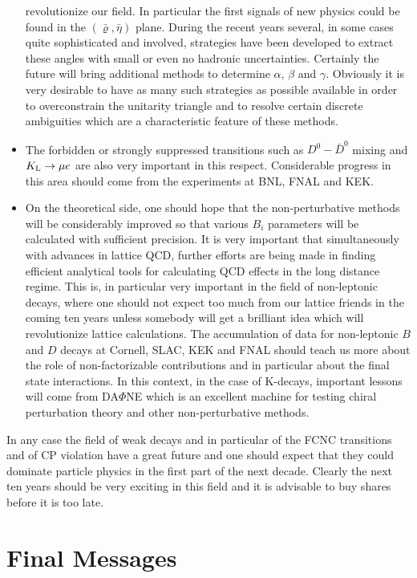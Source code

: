 \begin{itemize}
revolutionize our field. In particular the first signals
of new physics could be found in the $(\bar\varrho,\bar\eta)$ plane.
During the recent years several, in some cases quite sophisticated and
involved, strategies have been developed to extract these angles with
small or even no hadronic uncertainties. Certainly the future will bring
additional methods to determine $\alpha$, $\beta$ and $\gamma$. 
Obviously it is very desirable to have as many such strategies as possible
available in order to overconstrain the unitarity triangle and to resolve 
certain discrete ambiguities which are a characteristic feature of these 
methods.
\item
The forbidden or strongly suppressed transitions such as
$D^0-\bar D^0$ mixing and $K_{\rm L}\to \mu e$ are also very
important in this respect. Considerable progress in this area
should come from the experiments at BNL, FNAL and KEK.
\item
On the theoretical side,
one should hope that the non-perturbative
methods will be considerably improved so that various $B_i$ parameters
will be calculated with sufficient precision. It is very important
that simultaneously with advances in lattice QCD, further efforts
are being made in finding efficient analytical tools for calculating
QCD effects in the long distance regime. This is, in particular very
important in the field of non-leptonic decays, where one should
not expect too much from our lattice friends in the coming ten years
unless somebody will get a brilliant idea which will revolutionize
lattice calculations. The accumulation of data for non-leptonic $B$
and $D$
decays at Cornell, SLAC, KEK and FNAL should teach us more 
about the role of non-factorizable contributions and in particular
about the final state interactions. 
In this context, in the case of K-decays, important
lessons will come from DA$\Phi$NE which is an excellent machine
for testing chiral perturbation theory and other non-perturbative
methods. 
\end{itemize}

In any case the field of weak decays and in particular of the FCNC 
transitions and of CP violation have a great future and
one should expect that they could dominate particle physics in the first 
part of the next decade. 
Clearly the next ten years should be very exciting in this field
and it is advisable
to buy shares before it is too late.

\section{Final Messages}

